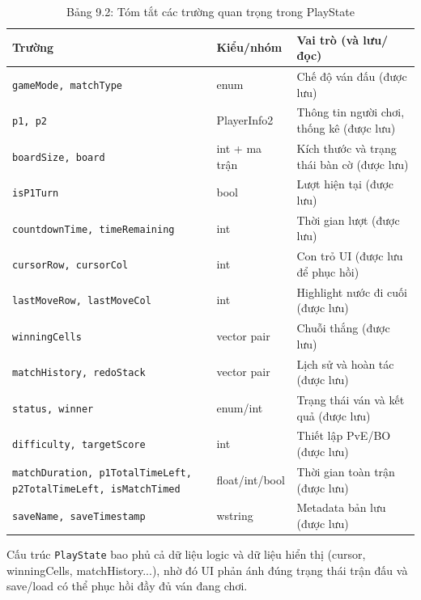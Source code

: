 \begin{table}[H]
\caption*{Bảng 9.2: Tóm tắt các trường quan trọng trong PlayState}
\label{tbl:ch9_playstate_fields}
\centering
\renewcommand{\arraystretch}{0.9}
\begin{tabularx}{\linewidth}{|L{4.0cm}|L{3.2cm}|X|}
\hline
\textbf{Trường} & \textbf{Kiểu/nhóm} & \textbf{Vai trò (và lưu/đọc)} \\ \hline
\texttt{gameMode, matchType} & enum & Chế độ ván đấu (được lưu) \\ \hline
\texttt{p1, p2} & PlayerInfo2 & Thông tin người chơi, thống kê (được lưu) \\ \hline
\texttt{boardSize, board} & int + ma trận & Kích thước và trạng thái bàn cờ (được lưu) \\ \hline
\texttt{isP1Turn} & bool & Lượt hiện tại (được lưu) \\ \hline
\texttt{countdownTime, timeRemaining} & int & Thời gian lượt (được lưu) \\ \hline
\texttt{cursorRow, cursorCol} & int & Con trỏ UI (được lưu để phục hồi) \\ \hline
\texttt{lastMoveRow, lastMoveCol} & int & Highlight nước đi cuối (được lưu) \\ \hline
\texttt{winningCells} & vector pair & Chuỗi thắng (được lưu) \\ \hline
\texttt{matchHistory, redoStack} & vector pair & Lịch sử và hoàn tác (được lưu) \\ \hline
\texttt{status, winner} & enum/int & Trạng thái ván và kết quả (được lưu) \\ \hline
\texttt{difficulty, targetScore} & int & Thiết lập PvE/BO (được lưu) \\ \hline
\texttt{matchDuration, p1TotalTimeLeft, p2TotalTimeLeft, isMatchTimed} & float/int/bool & Thời gian toàn trận (được lưu) \\ \hline
\texttt{saveName, saveTimestamp} & wstring & Metadata bản lưu (được lưu) \\ \hline
\end{tabularx}
\end{table}

\setlength{\parindent}{1.5em} Cấu trúc \texttt{PlayState} bao phủ cả dữ liệu logic và dữ liệu hiển thị (cursor, winningCells, matchHistory...), nhờ đó UI phản ánh đúng trạng thái trận đấu và save/load có thể phục hồi đầy đủ ván đang chơi.

